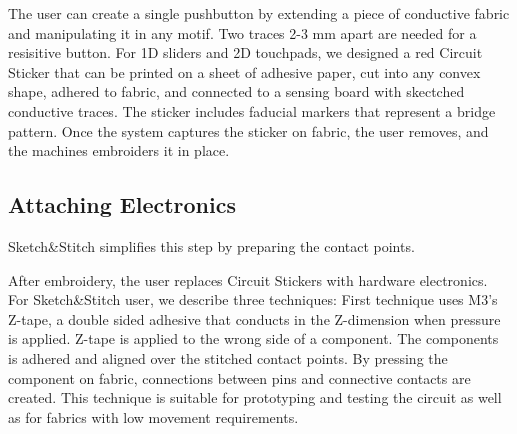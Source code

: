 \documentclass[header.tex]{subfiles}
\begin{document}
The user can create a single pushbutton by extending a piece of conductive fabric and manipulating it in any motif. Two traces 2-3 mm apart are needed for a resisitive button. For 1D sliders and 2D touchpads, we designed a red Circuit Sticker that can be printed on a sheet of adhesive paper, cut into any convex shape, adhered to fabric, and connected to a sensing board with skectched conductive traces. The sticker includes faducial markers that represent a bridge pattern. Once the system captures the sticker on fabric, the user removes, and the machines embroiders it in place.







\subsection{Attaching Electronics}

Sketch\&Stitch simplifies this step by preparing the contact points.


After embroidery, the user replaces Circuit Stickers with hardware electronics. 
For Sketch\&Stitch user, we describe three techniques: First technique uses M3's Z-tape, a double sided adhesive that conducts in the Z-dimension when pressure is applied. Z-tape is applied to the wrong side of a component. The components is adhered and aligned over the stitched contact points. By pressing the component on fabric, connections between pins and connective contacts are created. This technique is suitable for prototyping and testing the circuit as well as for fabrics with low movement requirements. 
\end{document}

